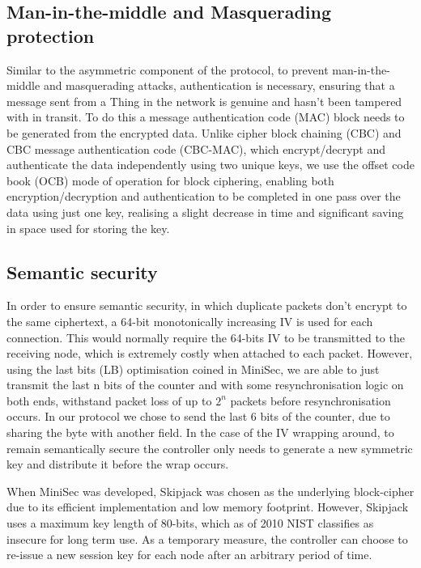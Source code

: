 \documentclass{mpaper}
\begin{document}
\subsection{Man-in-the-middle and Masquerading protection} %
\label{sub:man_in_the_middle_and_masquerading_protection}
Similar to the asymmetric component of the protocol, to prevent man-in-the-middle and masquerading attacks, authentication is necessary, ensuring that a message sent from a Thing in the network is genuine and hasn't been tampered with in transit. To do this a message authentication code (MAC) block needs to be generated from the encrypted data. Unlike cipher block chaining (CBC) and CBC message authentication code (CBC-MAC), which encrypt/decrypt and authenticate the data independently using two unique keys, we use the offset code book (OCB) mode of operation for block ciphering, enabling both encryption/decryption and authentication to be completed in one pass over the data using just one key, realising a slight decrease in time\cite{ContikiSec} and significant saving in space used for storing the key.

\subsection{Semantic security} %
\label{sub:semantic_security}
In order to ensure semantic security, in which duplicate packets don't encrypt to the same ciphertext, a 64-bit monotonically increasing IV is used for each connection. This would normally require the 64-bits IV to be transmitted to the receiving node, which is extremely costly when attached to each packet. However, using the last bits (LB) optimisation coined in MiniSec, we are able to just transmit the last n bits of the counter and with some resynchronisation logic on both ends, withstand packet loss of up to $2^n$ packets before resynchronisation occurs. In our protocol we chose to send the last 6 bits of the counter, due to sharing the byte with another field. In the case of the IV wrapping around, to remain semantically secure the controller only needs to generate a new symmetric key and distribute it before the wrap occurs.

When MiniSec was developed, Skipjack was chosen as the underlying block-cipher due to its efficient implementation and low memory footprint\cite{Skipjack}. However, Skipjack uses a maximum key length of 80-bits, which as of 2010 NIST classifies as insecure for long term use\cite{NIST}. As a temporary measure, the controller can choose to re-issue a new session key for each node after an arbitrary period of time.  
\end{document}
